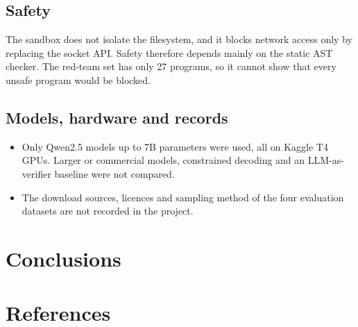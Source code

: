 \documentclass[11pt]{article}
\providecommand{\tightlist}{\setlength{\itemsep}{0pt}\setlength{\parskip}{0pt}}
\begin{document}
\subsection{Safety}

The sandbox does not isolate the filesystem, and it blocks network
access only by replacing the socket API. Safety therefore depends mainly
on the static AST checker. The red-team set has only 27 programs, so it
cannot show that every unsafe program would be blocked.

\subsection{Models, hardware and records}

\begin{itemize}
\tightlist
\item
  Only Qwen2.5 models up to 7B parameters were used, all on Kaggle T4
  GPUs. Larger or commercial models, constrained decoding and an
  LLM-as-verifier baseline were not compared.
\item
  The download sources, licences and sampling method of the four
  evaluation datasets are not recorded in the project.
\end{itemize}

\section{Conclusions}

\section{References}
\end{document}
